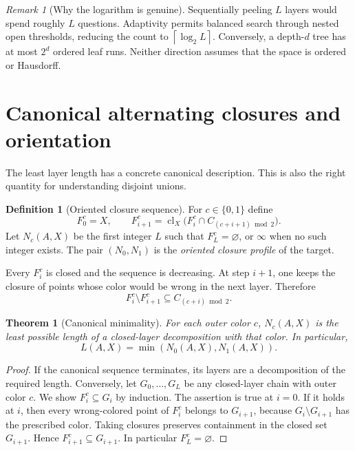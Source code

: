 \documentclass[11pt,letterpaper]{article}
\numberwithin{equation}{section}
\newtheorem{theorem}{Theorem}[section]
\theoremstyle{definition}
\newtheorem{definition}[definition]{Definition}
\theoremstyle{remark}
\newtheorem{remark}[remark]{Remark}
\newcommand{\cl}{\operatorname{cl}}
\newcommand{\ceil}[1]{\left\lceil#1\right\rceil}
\begin{document}
\begin{remark}[Why the logarithm is genuine]
Sequentially peeling $L$ layers would spend roughly $L$ questions. Adaptivity
permits balanced search through nested open thresholds, reducing the count to
$\ceil{\log_2 L}$. Conversely, a depth-$d$ tree has at most $2^d$ ordered leaf
runs. Neither direction assumes that the space is ordered or Hausdorff.
\end{remark}

\section{Canonical alternating closures and orientation}

The least layer length has a concrete canonical description. This is also the
right quantity for understanding disjoint unions.

\begin{definition}[Oriented closure sequence]\label{def:closure}
For $c\in\{0,1\}$ define
\begin{equation}\label{eq:greedy}
 F^c_0=X,\qquad
 F^c_{i+1}=\cl_X\bigl(F^c_i\cap C_{(c+i+1)\bmod2}\bigr).
\end{equation}
Let $N_c(A,X)$ be the first integer $L$ such that $F^c_L=\varnothing$, or
$\infty$ when no such integer exists. The pair $(N_0,N_1)$ is the
\emph{oriented closure profile} of the target.
\end{definition}

Every $F^c_i$ is closed and the sequence is decreasing. At step $i+1$, one keeps
the closure of points whose color would be wrong in the next layer. Therefore
\[
 F^c_i\setminus F^c_{i+1}\subseteq C_{(c+i)\bmod2}.
\]

\begin{theorem}[Canonical minimality]\label{thm:greedy}
For each outer color $c$, $N_c(A,X)$ is the least possible length of a
closed-layer decomposition with that color. In particular,
\begin{equation}\label{eq:profileformula}
 L(A,X)=\min(N_0(A,X),N_1(A,X)).
\end{equation}
\end{theorem}
\begin{proof}
If the canonical sequence terminates, its layers are a decomposition of the
required length. Conversely, let $G_0,\ldots,G_L$ be any closed-layer chain
with outer color $c$. We show $F^c_i\subseteq G_i$ by induction.
The assertion is true at $i=0$. If it holds at $i$, then every wrong-colored
point of $F^c_i$ belongs to $G_{i+1}$, because $G_i\setminus G_{i+1}$ has the
prescribed color. Taking closures preserves containment in the closed set
$G_{i+1}$. Hence $F^c_{i+1}\subseteq G_{i+1}$. In particular $F^c_L=\varnothing$.
\end{proof}
\end{document}

